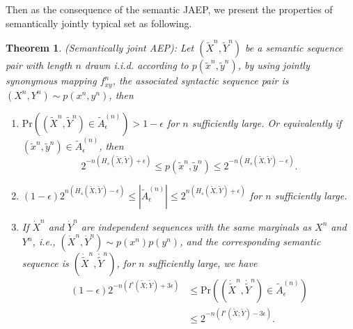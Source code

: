 \documentclass[12pt, draftclsnofoot,onecolumn]{IEEEtran}
\newtheorem{theorem}{\bf{Theorem}}
\begin{document}
Then as the consequence of the semantic JAEP, we present the properties of semantically jointly typical set as following.
\begin{theorem}\label{Sem_JAEP_theorem}
(Semantically joint AEP): Let $(\tilde{X}^n,\tilde{Y}^n)$ be a semantic sequence pair with length $n$ drawn i.i.d. according to $p(\tilde{x}^n,\tilde{y}^n)$, by using jointly synonymous mapping $f_{xy}^n$, the associated syntactic sequence pair is $(X^n, Y^n)\sim p(x^n,y^n)$, then
\begin{enumerate}[(1)]
    \item $\text{Pr}((\tilde{X}^n,\tilde{Y}^n)\in \tilde{A}_{\epsilon}^{(n)})>1-\epsilon$ for $n$ sufficiently large. Or equivalently if $\left(\tilde{x}^n,\tilde{y}^n\right)\in \tilde{A}_{\epsilon}^{(n)}$, then
         \begin{equation}\label{Sem_JAEPinequality}
        2^{-n\left(H_s(\tilde{X},\tilde{Y})+\epsilon\right)}\leq p\left(\tilde{x}^n,\tilde{y}^n\right) \leq 2^{-n\left(H_s(\tilde{X},\tilde{Y})-\epsilon\right)}.
        \end{equation}
    \item $\left(1-\epsilon\right) 2^{n\left(H_s(\tilde{X},\tilde{Y})-\epsilon\right)}\leq \left|\tilde{A}_{\epsilon}^{(n)}\right| \leq 2^{n\left(H_s(\tilde{X},\tilde{Y})+\epsilon\right)}$ for $n$ sufficiently large.
    \item If $\dot{X}^n$ and $\dot{Y}^n$ are independent sequences with the same marginals as $X^n$ and $Y^n$, i.e., $(\dot{X}^n,\dot{Y}^n)\sim p(x^n)p(y^n)$,  and the corresponding semantic sequence is $(\dot{\tilde{X}}^n,\dot{\tilde{Y}}^n)$, for $n$ sufficiently large, we have
        \begin{equation}\label{jointly_typical_equality}
        \begin{aligned}
        (1-\epsilon)2^{-n(I^s(\tilde{X};\tilde{Y})+3\epsilon)}& \leq \text{Pr}((\dot{\tilde{X}}^n,\dot{\tilde{Y}}^n)\in \tilde{A}_{\epsilon}^{(n)}) \\
                                                                                        & \leq 2^{-n(I^s(\tilde{X};\tilde{Y})-3\epsilon)}.
        \end{aligned}
        \end{equation}
\end{enumerate}
\end{theorem}
\end{document}
